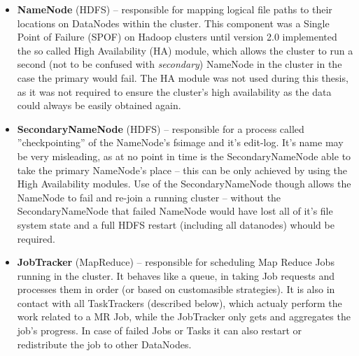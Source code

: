\begin{itemize}
  \item \textbf{NameNode} (HDFS) -- responsible for mapping logical file paths to their locations on DataNodes within 
                                    the cluster. This component was a Single Point of Failure (SPOF) on Hadoop clusters 
                                    until version 2.0 implemented the so called High Availability (HA) module, which 
                                    allows the cluster to run a second (not to be confused with \textit{secondary}) 
                                    NameNode in the cluster in the case the primary would fail. The HA module was not 
                                    used during this thesis, as it was not required to ensure the cluster's high 
                                    availability as the data could always be easily obtained again.
  \item \textbf{SecondaryNameNode} (HDFS) -- responsible for a process called ''checkpointing'' of the NameNode's 
                                            fsimage and it's edit-log. It's name may be very misleading, as at no point
                                            in time is the SecondaryNameNode able to take the primary NameNode's place -- 
                                            this can be only achieved by using the High Availability modules. Use of the 
                                            SecondaryNameNode though allows the NameNode to fail and re-join a running 
                                            cluster -- without the SecondaryNameNode that failed NameNode would have lost 
                                            all of it's file system state and a full HDFS restart (including all 
                                            datanodes) whould be required.
  \item \textbf{JobTracker} (MapReduce) -- responsible for scheduling Map Reduce Jobs running in the cluster. It
                                           behaves like a queue, in taking Job requests and processes them in order (or    
                                           based on customasible strategies). It is also in contact with all TaskTrackers 
                                           (described below), which actualy perform the work related to a MR Job, while 
                                           the JobTracker only gets and aggregates the job's progress. In case of failed 
                                           Jobs or Tasks it can also restart or redistribute the job to other DataNodes.
\end{itemize}

